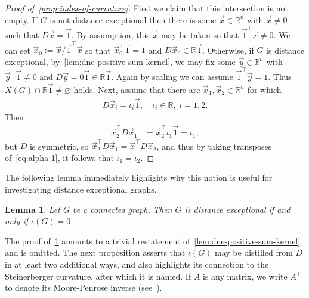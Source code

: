 \documentclass[11pt,a4paper]{article}
\newcommand{\distmatrix}{D}
\newcommand{\x}{\vec{x}}
\newcommand{\y}{\vec{y}}
\newcommand{\one}{\vec{1}}
\newtheorem{lemma}[theorem]{Lemma}
\begin{document}
    \begin{proof}[Proof of~\cref{prop:index-of-curvature}]
        First we claim that this intersection is not empty. If $G$ is not distance exceptional then there is some $\x\in\mathbb{R}^{n}$ with $\x\neq 0$ such that $\distmatrix\x = \one$. By assumption, this $\x$ may be taken so that $\one^\top\x \neq 0$. We can set $\x_0 := \x / \one^\top\x$ so that $\x_0^\top\one = 1$ and $\distmatrix\x_0\in \mathbb{R}\one$. Otherwise, if $G$ is distance exceptional, by~\cref{lem:dne-positive-sum-kernel}, we may fix some $\y\in\mathbb{R}^{n}$ with $\y^\top\one  \neq0$ and $\distmatrix\y = 0\one\in\mathbb{R}\one$. Again by scaling we can assume $\one^\top \y = 1$. Thus $X(G)\cap\mathbb{R}\one \neq\varnothing$ holds. Next, assume that there are $\x_1,\x_2\in\mathbb{R}^{n}$ for which 
            \begin{align*}
                \distmatrix\x_i = \iota_i\one,\quad \iota_i\in\mathbb{R},\; i=1, 2.
            \end{align*}
        Then
            \begin{align}\label{eq:alpha-1}
                \x_2^\top \distmatrix\x_1 &= \x_2^\top \iota_1 \one = \iota_1,
            \end{align}
        but $\distmatrix$ is symmetric, so $\x_2^\top \distmatrix\x_1 = \x_1^\top \distmatrix\x_2$, and thus by taking transposes of~\cref{eq:alpha-1}, it follows that $\iota_1 = \iota_2$.
    \end{proof}

    The following lemma immediately highlights why this notion is useful for investigating distance exceptional graphs.

    \begin{lemma}\label{lem:beta-zero-is-dx}
        Let $G$ be a connected graph. Then $G$ is distance exceptional if and only if $\iota(G) = 0$.
    \end{lemma}

    The proof of~\cref{lem:beta-zero-is-dx} amounts to a trivial restatement of~\cref{lem:dne-positive-sum-kernel} and is omitted. The next proposition asserts that $\iota(G)$ may be distilled from $\distmatrix$ in at least two additional ways, and also highlights its connection to the Steinerberger curvature, after which it is named. If $A$ is any matrix, we write $A^+$ to denote its Moore-Penrose inverse (see~\cite{ben1963contributions}).
\end{document}
